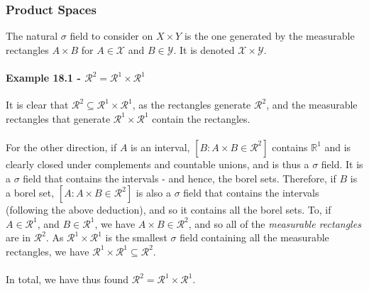 \documentclass[12pt,a4paper]{article}
\newcommand{\1}[1]{\mathbbm{1}\left\{ #1 \right\}}
\newcommand{\R}{\mathbb{R}}
\newcommand{\rcal}{\mathcal{R}}
\newcommand{\xcal}{\mathcal{X}}
\newcommand{\ycal}{\mathcal{Y}}
\begin{document}
\subsubsection{Product Spaces} The natural $\sigma$ field to consider on $X \times Y$ is the one generated by the measurable rectangles $A \times B$ for $A \in \xcal$ and $B \in \ycal$. It is denoted $\xcal \times \ycal$.

\paragraph{Example 18.1 - $\rcal^2 = \rcal^1 \times \rcal^1$} It is clear that $\rcal^2 \subseteq \rcal^1 \times \rcal^1$, as the rectangles generate $\rcal^2$, and the measurable rectangles that generate $\rcal^1 \times \rcal^1$ contain the rectangles.
\\\\
For the other direction, if $A$ is an interval, $[B : A \times B \in \rcal^2]$ contains $\R^1$ and is clearly closed under complements and countable unions, and is thus a $\sigma$ field. It is a $\sigma$ field that contains the intervals - and hence, the borel sets. Therefore, if $B$ is a borel set, $[A : A \times B \in \rcal^2]$ is also a $\sigma$ field that contains the intervals (following the above deduction), and so it contains all the borel sets. To, if $A \in \rcal^1$, and $B \in \rcal^1$, we have $A \times B \in \rcal^2$, and so all of the \textit{measurable rectangles} are in $\rcal^2$. As $\rcal^1 \times \rcal^1$ is the smallest $\sigma$ field containing all the measurable rectangles, we have $\rcal^1 \times \rcal^1 \subseteq \rcal^2$.
\\\\
In total, we have thus found $\rcal^2 = \rcal^1 \times \rcal^1$.
\end{document}
